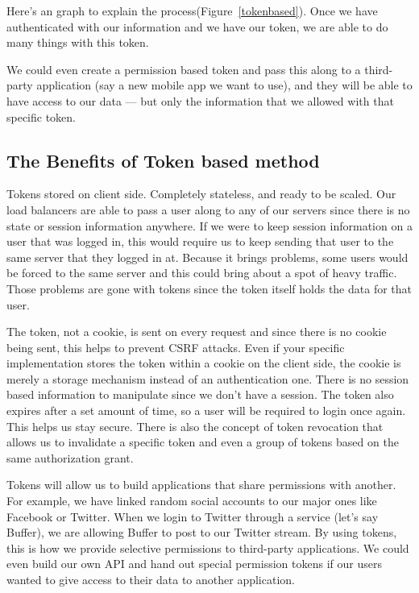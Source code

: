 \documentclass[journal,article,submit,moreauthors,pdftex,10pt,a4paper]{mdpi}
\begin{document}
Here’s an graph to explain the process(Figure~\ref{tokenbased}). Once we have authenticated with our information and we have our token, we are able to do many things with this token\cite{token-based-fast}.

We could even create a permission based token and pass this along to a third-party application (say a new mobile app we want to use\cite{token-based-mobile}), and they will be able to have access to our data — but only the information that we allowed with that specific token.

\subsection{The Benefits of Token based method}
Tokens stored on client side. Completely stateless, and ready to be scaled. Our load balancers are able to pass a user along to any of our servers since there is no state or session information anywhere. If we were to keep session information on a user that was logged in, this would require us to keep sending that user to the same server that they logged in at. Because it brings problems, some users would be forced to the same server and this could bring about a spot of heavy traffic. Those problems are gone with tokens since the token itself holds the data for that user.

The token, not a cookie, is sent on every request and since there is no cookie being sent, this helps to prevent CSRF attacks. Even if your specific implementation stores the token within a cookie on the client side, the cookie is merely a storage mechanism instead of an authentication one. There is no session based information to manipulate since we don’t have a session. The token also expires after a set amount of time, so a user will be required to login once again. This helps us stay secure. There is also the concept of token revocation that allows us to invalidate a specific token and even a group of tokens based on the same authorization grant\cite{evaluating-authentication}.

Tokens will allow us to build applications that share permissions with another. For example, we have linked random social accounts to our major ones like Facebook or Twitter. When we login to Twitter through a service (let’s say Buffer), we are allowing Buffer to post to our Twitter stream. By using tokens, this is how we provide selective permissions to third-party applications. We could even build our own API and hand out special permission tokens if our users wanted to give access to their data to another application.
\end{document}
